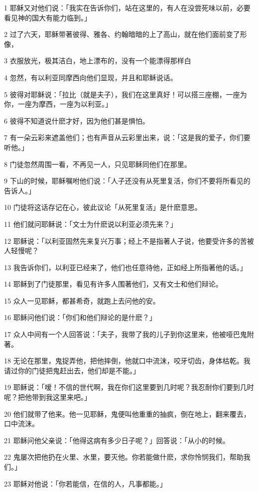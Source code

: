 \par 1 耶稣又对他们说：「我实在告诉你们，站在这里的，有人在没尝死味以前，必要看见神的国大有能力临到。」
\par 2 过了六天，耶稣带著彼得、雅各、约翰暗暗的上了高山，就在他们面前变了形像，
\par 3 衣服放光，极其洁白，地上漂布的，没有一个能漂得那样白
\par 4 忽然，有以利亚同摩西向他们显现，并且和耶稣说话。
\par 5 彼得对耶稣说：「拉比（就是夫子），我们在这里真好！可以搭三座棚，一座为你，一座为摩西，一座为以利亚。」
\par 6 彼得不知道说什麽才好，因为他们甚是惧怕。
\par 7 有一朵云彩来遮盖他们；也有声音从云彩里出来，说：「这是我的爱子，你们要听他。」
\par 8 门徒忽然周围一看，不再见一人，只见耶稣同他们在那里。
\par 9 下山的时候，耶稣嘱咐他们说：「人子还没有从死里复活，你们不要将所看见的告诉人。」
\par 10 门徒将这话存记在心，彼此议论「从死里复活」是什麽意思。
\par 11 他们就问耶稣说：「文士为什麽说以利亚必须先来？」
\par 12 耶稣说：「以利亚固然先来复兴万事；经上不是指著人子说，他要受许多的苦被人轻慢呢？
\par 13 我告诉你们，以利亚已经来了，他们也任意待他，正如经上所指著他的话。」
\par 14 耶稣到了门徒那里，看见有许多人围著他们，又有文士和他们辩论。
\par 15 众人一见耶稣，都甚希奇，就跑上去问他的安。
\par 16 耶稣问他们说：「你们和他们辩论的是什麽？」
\par 17 众人中间有一个人回答说：「夫子，我带了我的儿子到你这里来，他被哑巴鬼附著。
\par 18 无论在那里，鬼捉弄他，把他摔倒，他就口中流沫，咬牙切齿，身体枯乾。我请过你的门徒把鬼赶出去，他们却是不能。」
\par 19 耶稣说：「嗳！不信的世代啊，我在你们这里要到几时呢？我忍耐你们要到几时呢？把他带到我这里来吧。」
\par 20 他们就带了他来。他一见耶稣，鬼便叫他重重的抽疯，倒在地上，翻来覆去，口中流沫。
\par 21 耶稣问他父亲说：「他得这病有多少日子呢？」回答说：「从小的时候。
\par 22 鬼屡次把他扔在火里、水里，要灭他。你若能做什麽，求你怜悯我们，帮助我们。」
\par 23 耶稣对他说：「你若能信，在信的人，凡事都能。」

